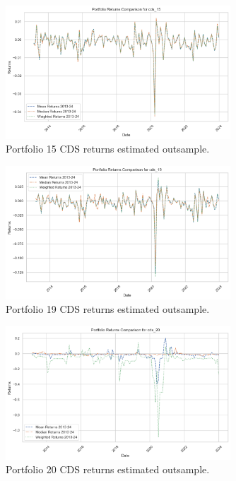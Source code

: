 \documentclass{article}
\begin{document}
\begin{figure}[H]
    \centering
    \includegraphics[width=0.75\textwidth]{../assets/returns_cds15_2013_2024.png}
    \caption{\label{fig:myplot}Portfolio 15 CDS returns estimated outsample.}
    \end{figure}          

\begin{figure}[H]
    \centering
    \includegraphics[width=0.75\textwidth]{../assets/returns_cds19_2013_2024.png}
    \caption{\label{fig:myplot}Portfolio 19 CDS returns estimated outsample.}
    \end{figure}   

\begin{figure}[H]
    \centering
    \includegraphics[width=0.75\textwidth]{../assets/returns_cds20_2013_2024.png}
    \caption{\label{fig:myplot}Portfolio 20 CDS returns estimated outsample.}
    \end{figure}   
    
\end{document}
